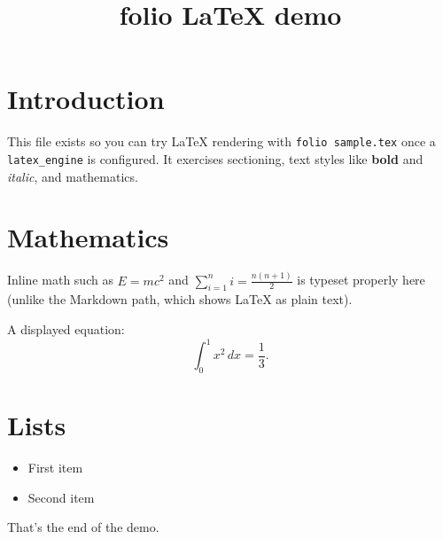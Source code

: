 \documentclass[11pt]{article}
\title{folio LaTeX demo}
\author{}
\date{}
\begin{document}
\maketitle

\section{Introduction}
This file exists so you can try LaTeX rendering with \texttt{folio sample.tex}
once a \texttt{latex\_engine} is configured. It exercises sectioning, text styles
like \textbf{bold} and \textit{italic}, and mathematics.

\section{Mathematics}
Inline math such as $E = mc^2$ and $\sum_{i=1}^{n} i = \frac{n(n+1)}{2}$ is typeset
properly here (unlike the Markdown path, which shows LaTeX as plain text).

A displayed equation:
\begin{equation}
    \int_0^1 x^2 \, dx = \frac{1}{3}.
\end{equation}

\section{Lists}
\begin{itemize}
    \item First item
    \item Second item
\end{itemize}

That's the end of the demo.
\end{document}
